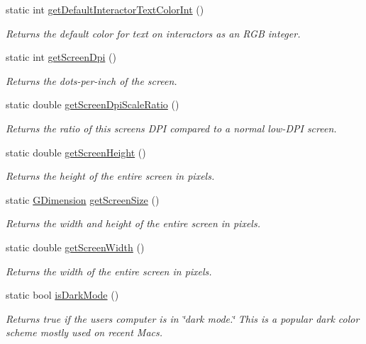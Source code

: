 \begin{DoxyCompactItemize}
static int \mbox{\hyperlink{classGWindow_a66c284abc8a53870127d079f904489c5}{get\+Default\+Interactor\+Text\+Color\+Int}} ()
\begin{DoxyCompactList}\small\item\em Returns the default color for text on interactors as an R\+GB integer. \end{DoxyCompactList}\item 
static int \mbox{\hyperlink{classGWindow_aea783b75281f864f14e958d2fee28f9d}{get\+Screen\+Dpi}} ()
\begin{DoxyCompactList}\small\item\em Returns the dots-\/per-\/inch of the screen. \end{DoxyCompactList}\item 
static double \mbox{\hyperlink{classGWindow_ab15179b683630109f0ac256590a3b323}{get\+Screen\+Dpi\+Scale\+Ratio}} ()
\begin{DoxyCompactList}\small\item\em Returns the ratio of this screen\textquotesingle{}s D\+PI compared to a normal low-\/\+D\+PI screen. \end{DoxyCompactList}\item 
static double \mbox{\hyperlink{classGWindow_a9942379fdf4fb4445c35eaf3390b7ccb}{get\+Screen\+Height}} ()
\begin{DoxyCompactList}\small\item\em Returns the height of the entire screen in pixels. \end{DoxyCompactList}\item 
static \mbox{\hyperlink{structGDimension}{G\+Dimension}} \mbox{\hyperlink{classGWindow_ae3d08d5cde8163274459797770596809}{get\+Screen\+Size}} ()
\begin{DoxyCompactList}\small\item\em Returns the width and height of the entire screen in pixels. \end{DoxyCompactList}\item 
static double \mbox{\hyperlink{classGWindow_adc82933bd579ab83d7cd4e3bc5f79a12}{get\+Screen\+Width}} ()
\begin{DoxyCompactList}\small\item\em Returns the width of the entire screen in pixels. \end{DoxyCompactList}\item 
static bool \mbox{\hyperlink{classGWindow_a36044a6efa9c4e015378e56c3e37181d}{is\+Dark\+Mode}} ()
\begin{DoxyCompactList}\small\item\em Returns true if the user\textquotesingle{}s computer is in \char`\"{}dark mode.\char`\"{} This is a popular dark color scheme mostly used on recent Macs. \end{DoxyCompactList}\item 

\end{DoxyCompactItemize}
